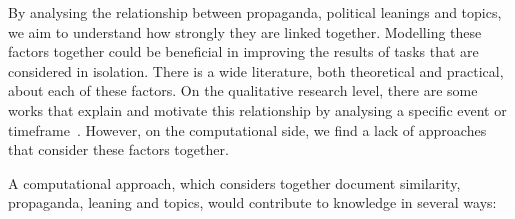 



By analysing the relationship between propaganda, political leanings and topics, we aim to understand how strongly they are linked together.
Modelling these factors together could be beneficial in improving the results of tasks that are considered in isolation.
There is a wide literature, both theoretical and practical, about each of these factors.
On the qualitative research level, there are some works that explain and motivate this relationship by analysing a specific event or timeframe~\citep{pierri2023propaganda,golovchenko2020cross,blumberg1986comparative}.
However, on the computational side, we find a lack of approaches that consider these factors together.

A computational approach, which considers together document similarity, propaganda, leaning and topics, would contribute to knowledge in several ways:


